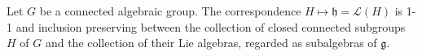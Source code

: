 Let $G$ be a connected algebraic group. The correspondence $H \mapsto \mathfrak{h} = \mathcal{L}(H)$ is 1-1 and inclusion preserving between the collection of closed connected subgroups $H$ of $G$ and the collection of their Lie algebras, regarded as subalgebras of $\mathfrak{g}$.
